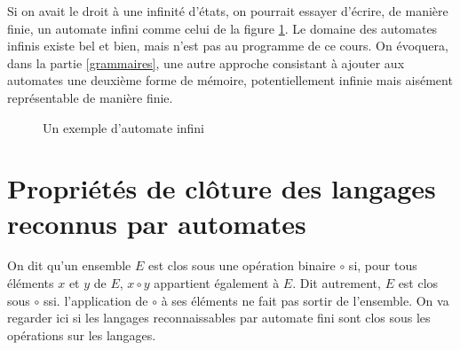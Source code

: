 Si on avait le droit à une infinité d'états, on pourrait essayer d'écrire, de manière finie, un automate infini comme celui de la figure \ref{infini}. Le domaine des automates infinis existe bel et bien, mais n'est pas au programme de ce cours. On évoquera, dans la partie \ref{grammaires}, une autre approche consistant à ajouter aux automates une deuxième forme de mémoire, potentiellement infinie mais aisément représentable de manière finie.

\begin{figure}[H]
\caption{Un exemple d'automate infini}
\label{infini}
\end{figure}

\section{Propriétés de clôture des langages reconnus par automates}
\label{cloture}

On dit qu'un ensemble $E$ est clos sous une opération binaire $\circ$ si, pour tous éléments $x$ et $y$ de $E$, $x \circ y$ appartient également à $E$. Dit autrement, $E$ est clos sous $\circ$ ssi. l'application de $\circ$ à ses éléments ne fait pas sortir de l'ensemble. On va regarder ici si les langages reconnaissables par automate fini sont clos sous les opérations sur les langages.


